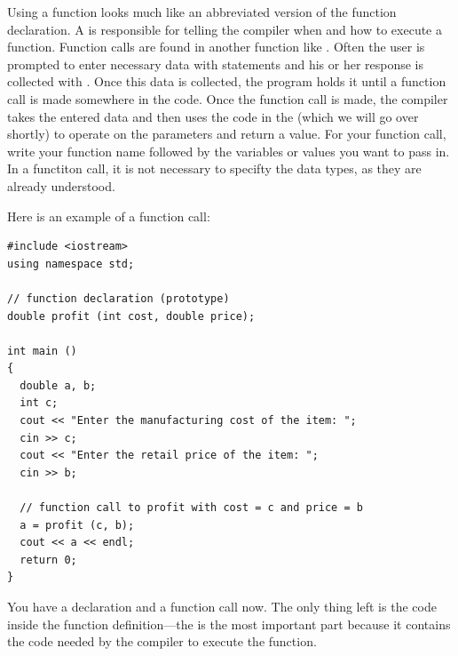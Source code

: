 Using a function looks much like an abbreviated version of the function declaration. 
A  is responsible for telling the compiler when and how to execute a function.
Function calls are found in another function like . 
Often the user is prompted to enter necessary data with  statements and his or her response is collected with . 
Once this data is collected, the program holds it until a function call is made somewhere in the code.
Once the function call is made, the compiler takes the entered data and then uses the code in the  (which we will go over shortly) to operate on the parameters and return a value. 
For your function call, write your function name followed by the variables or values you want to pass in.
In a functiton call, it is not necessary to specifty the data types, as they are already understood.
 
\noindent Here is an example of a function call: \nopagebreak[4]

\noindent\begin{minipage}{\linewidth}\begin{lstlisting}
#include <iostream>
using namespace std;

// function declaration (prototype)
double profit (int cost, double price); 

int main ()
{
  double a, b;
  int c;
  cout << "Enter the manufacturing cost of the item: ";
  cin >> c;
  cout << "Enter the retail price of the item: ";
  cin >> b;
 
  // function call to profit with cost = c and price = b
  a = profit (c, b); 
  cout << a << endl;
  return 0;
}
\end{lstlisting}\end{minipage}
  
You have a declaration and a function call now. 
The only thing left is the code inside the function definition---the  is the most important part because it contains the code needed by the compiler to execute the function.


